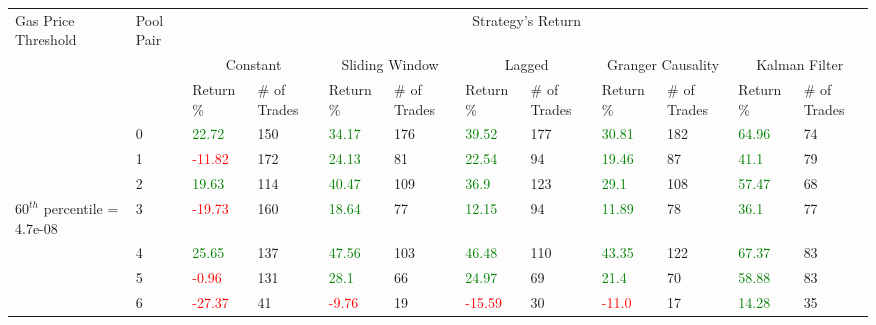 \begin{table}[htb!]
    \centering
    \begin{adjustwidth}{-0.9in}{-0.9in}
        \begin{tabular}{|p{5em}|p{2em}|p{3em}|p{3em}|p{3em}|p{3em}|p{3em}|p{3em}|p{3em}|p{3em}|p{3em}|p{3em}|}\hline
            Gas Price Threshold & Pool Pair & \multicolumn{10}{|c|}{Strategy's Return} \\\cline{3-12}
            &   & \multicolumn{2}{|c|}{Constant} & \multicolumn{2}{|c|}{Sliding Window} & \multicolumn{2}{|c|}{Lagged} & \multicolumn{2}{|c|}{Granger Causality} & \multicolumn{2}{|c|}{Kalman Filter}\\\cline{3-12}
            & & Return \% & \# of Trades & Return \% & \# of Trades & Return \% & \# of Trades & Return \% & \# of Trades & Return \% & \# of Trades\\\hline
            
            & 0 & \textcolor{green}{22.72} & 150 & \textcolor{green}{34.17} & 176 & \textcolor{green}{39.52} & 177 & \textcolor{green}{30.81} & 182 & \textcolor{green}{64.96} & 74\\\cline{3-12}
            & 1 & \textcolor{red}{-11.82} & 172 & \textcolor{green}{24.13} & 81 & \textcolor{green}{22.54} & 94 & \textcolor{green}{19.46} & 87 & \textcolor{green}{41.1} & 79\\\cline{3-12}
            & 2 & \textcolor{green}{19.63} & 114 & \textcolor{green}{40.47} & 109 & \textcolor{green}{36.9} & 123 & \textcolor{green}{29.1} & 108 & \textcolor{green}{57.47} & 68\\\cline{3-12}
            $60^{th}$ percentile = 4.7e-08 & 3 & \textcolor{red}{-19.73} & 160 & \textcolor{green}{18.64} & 77 & \textcolor{green}{12.15} & 94 & \textcolor{green}{11.89} & 78 & \textcolor{green}{36.1} & 77\\\cline{3-12}
            & 4 & \textcolor{green}{25.65} & 137 & \textcolor{green}{47.56} & 103 & \textcolor{green}{46.48} & 110 & \textcolor{green}{43.35} & 122 & \textcolor{green}{67.37} & 83\\\cline{3-12}
            & 5 & \textcolor{red}{-0.96} & 131 & \textcolor{green}{28.1} & 66 & \textcolor{green}{24.97} & 69 & \textcolor{green}{21.4} & 70 & \textcolor{green}{58.88} & 83\\\cline{3-12}
            & 6 & \textcolor{red}{-27.37} & 41 & \textcolor{red}{-9.76} & 19 & \textcolor{red}{-15.59} & 30 & \textcolor{red}{-11.0} & 17 & \textcolor{green}{14.28} & 35\\\hline\hline


\end{tabular}
\end{adjustwidth}
\end{table}
